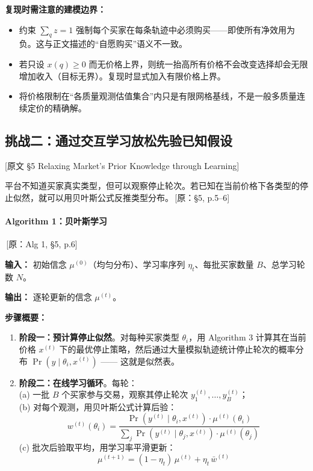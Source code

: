 \documentclass[12pt,a4paper]{article}
\newcommand{\srcref}[1]{\textcolor{black!65}{\footnotesize\,[原：#1]}}
\newcommand{\secref}[1]{\hspace{0.6em} \textcolor{black!80}{\footnotesize [原文 #1]}}
\theoremstyle{definition}
\begin{document}
\textbf{复现时需注意的建模边界：}
\begin{itemize}[leftmargin=*]
    \item 约束 $\sum_q z = 1$ 强制每个买家在每条轨迹中必须购买——即使所有净效用为负。这与正文描述的``自愿购买''语义不一致。
    \item 若只设 $x(q)\ge 0$ 而无价格上界，则统一抬高所有价格不会改变选择却会无限增加收入（目标无界）。复现时显式加入有限价格上界。
    \item 将价格限制在``各质量观测估值集合''内只是有限网格基线，不是一般多质量连续定价的精确解。
\end{itemize}

\subsection{挑战二：通过交互学习放松先验已知假设}
\secref{§5 Relaxing Market's Prior Knowledge through Learning}

平台不知道买家真实类型，但可以观察停止轮次。若已知在当前价格下各类型的停止似然，就可以用贝叶斯公式反推类型分布。\srcref{§5, p.5--6}

\paragraph{Algorithm 1：贝叶斯学习} \srcref{Alg 1, §5, p.6}

\textbf{输入：} 初始信念 $\mu^{(0)}$（均匀分布）、学习率序列 $\eta_t$、每批买家数量 $B$、总学习轮数 $N$。

\textbf{输出：} 逐轮更新的信念 $\mu^{(t)}$。

\textbf{步骤概要：}
\begin{enumerate}[leftmargin=*,nosep]
    \item \textbf{阶段一：预计算停止似然}。对每种买家类型 $\theta_i$，用 Algorithm 3 计算其在当前价格 $x^{(t)}$ 下的最优停止策略，然后通过大量模拟轨迹统计停止轮次的概率分布 $\Pr(y \mid \theta_i, x^{(t)})$ —— 这就是似然表。
    \item \textbf{阶段二：在线学习循环}。每轮：\\
    (a) 一批 $B$ 个买家参与交易，观察其停止轮次 $y^{(t)}_1, \dots, y^{(t)}_B$；\\
    (b) 对每个观测，用贝叶斯公式计算后验：
    \[
    w^{(t)}(\theta_i) = \frac{\Pr(y^{(t)}\mid\theta_i, x^{(t)}) \cdot \mu^{(t)}(\theta_i)}
    {\sum_j \Pr(y^{(t)}\mid\theta_j, x^{(t)}) \cdot \mu^{(t)}(\theta_j)}
    \]
    (c) 批次后验取平均，用学习率平滑更新：
    \[
    \mu^{(t+1)} = (1-\eta_t)\,\mu^{(t)} + \eta_t\,\bar{w}^{(t)}
    \]
\end{enumerate}
\end{document}
